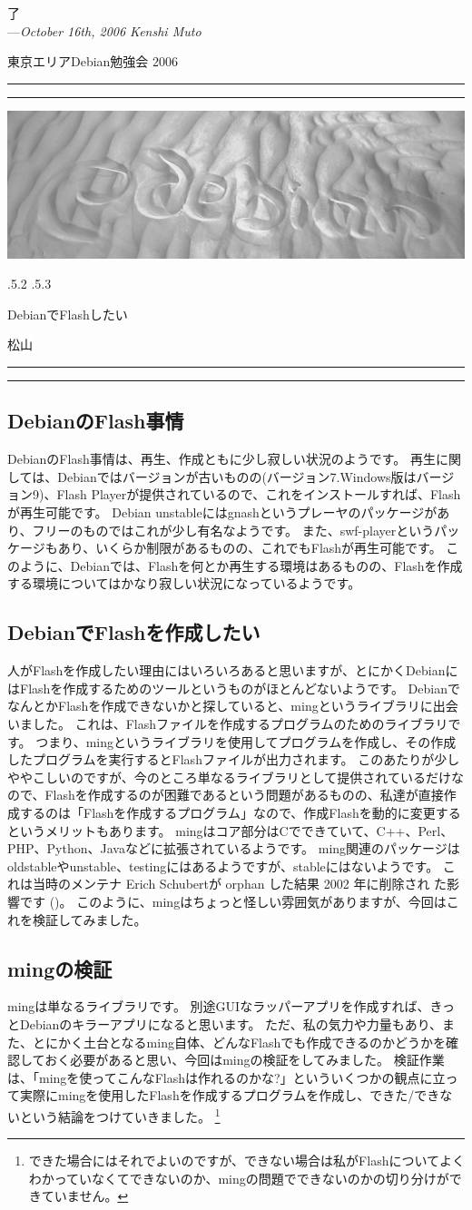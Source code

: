 \documentclass[mingoth,a4paper]{jsarticle}
\makeatletter
\renewcommand{\section}{\@startsection{section}{1}{\z@}%
    {\Cvs \@plus.5\Cdp \@minus.2\Cdp}%
    {.5\Cvs \@plus.3\Cdp}%
    {\normalfont\Huge\headfont\raggedright\centering}} %
\newcommand{\dancersection}[2]{%
\newpage
東京エリアDebian勉強会 2006
\hrule
\vspace{0.5mm}
\hrule
\hfill{}\includegraphics[width=16cm]{image2006-natsu/guruguru-sand-light.png}\\
\vspace{-5cm}
\begin{center}
\section{#1}
\end{center}
\hfill{}\colorbox{white}{#2}\hspace{3cm}\space\\
\vspace{1cm}
\hrule
\vspace{0.5mm}
\hrule
\vspace{1cm}
}
\makeatother
\begin{document}
\begin{flushright}
  了\\
  ---\emph{October 16th, 2006 Kenshi Muto}
\end{flushright}



\dancersection{DebianでFlashしたい}{松山}

\subsection{DebianのFlash事情}
DebianのFlash事情は、再生、作成ともに少し寂しい状況のようです。
再生に関しては、Debianではバージョンが古いものの(バージョン7.Windows版はバージョン9)、Flash Playerが提供されているので、これをインストールすれば、Flashが再生可能です。
Debian unstableにはgnashというプレーヤのパッケージがあり、フリーのものではこれが少し有名なようです。
また、swf-playerというパッケージもあり、いくらか制限があるものの、これでもFlashが再生可能です。
このように、Debianでは、Flashを何とか再生する環境はあるものの、Flashを作成する環境についてはかなり寂しい状況になっているようです。

\subsection{DebianでFlashを作成したい}
人がFlashを作成したい理由にはいろいろあると思いますが、とにかくDebianにはFlashを作成するためのツールというものがほとんどないようです。
DebianでなんとかFlashを作成できないかと探していると、mingというライブラリに出会いました。
これは、Flashファイルを作成するプログラムのためのライブラリです。
つまり、mingというライブラリを使用してプログラムを作成し、その作成したプログラムを実行するとFlashファイルが出力されます。
このあたりが少しややこしいのですが、今のところ単なるライブラリとして提供されているだけなので、Flashを作成するのが困難であるという問題があるものの、私達が直接作成するのは「Flashを作成するプログラム」なので、作成Flashを動的に変更するというメリットもあります。
mingはコア部分はCでできていて、C++、Perl、PHP、Python、Javaなどに拡張されているようです。
ming関連のパッケージはoldstableやunstable、testingにはあるようですが、stableにはないようです。
これは当時のメンテナ Erich Schubertが orphan した結果 2002 年に削除され
た影響です ()。
このように、mingはちょっと怪しい雰囲気がありますが、今回はこれを検証してみました。

\subsection{mingの検証}
mingは単なるライブラリです。
別途GUIなラッパーアプリを作成すれば、きっとDebianのキラーアプリになると思います。
ただ、私の気力や力量もあり、また、とにかく土台となるming自体、どんなFlashでも作成できるのかどうかを確認しておく必要があると思い、今回はmingの検証をしてみました。
検証作業は、「mingを使ってこんなFlashは作れるのかな?」といういくつかの観点に立って実際にmingを使用したFlashを作成するプログラムを作成し、できた/できないという結論をつけていきました。
\footnote{できた場合にはそれでよいのですが、できない場合は私がFlashについてよくわかっていなくてできないのか、mingの問題でできないのかの切り分けができていません。}
\end{document}
